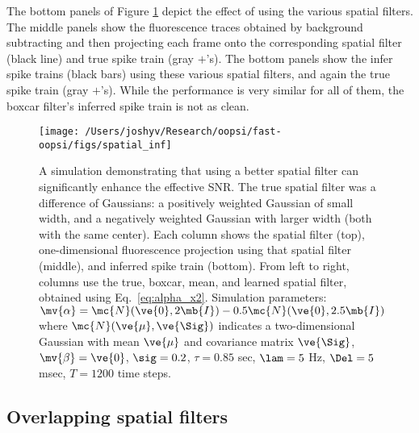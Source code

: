 The bottom panels of Figure \ref{fig:spatial} depict the effect of using the various spatial filters. The middle panels show the fluorescence traces obtained by background subtracting and then projecting each frame onto the corresponding spatial filter (black line) and true spike train (gray $+$'s).  The bottom panels show the infer spike trains (black bars) using these various spatial filters, and again the true spike train (gray $+$'s).  While the performance is very similar for all of them, the boxcar filter's inferred spike train is not as clean.  




\begin{figure}[h!]
\centering \texttt{[image: /Users/joshyv/Research/oopsi/fast-oopsi/figs/spatial\_inf]}
\caption[spatial filtering can improve effective SNR]{A simulation demonstrating that using a better spatial filter can significantly enhance the effective SNR. The true spatial filter was a difference of Gaussians: a positively weighted Gaussian of small width, and a negatively weighted Gaussian with larger width (both with the same center).  Each column shows the spatial filter (top), one-dimensional fluorescence projection using that spatial filter (middle), and inferred spike train (bottom).  From left to right, columns use the true, boxcar, mean, and learned spatial filter, obtained using Eq.~\eqref{eq:alpha_x2}. Simulation parameters: $\mv{\alpha}=\mc{N}(\ve{0},2 \mb{I})-0.5 \mc{N}(\ve{0},2.5 \mb{I})$ where $\mc{N}(\ve{\mu},\ve{\Sig})$ indicates a two-dimensional Gaussian with mean $\ve{\mu}$ and covariance matrix $\ve{\Sig}$, $\mv{\beta}=\ve{0}$, $\sig=0.2$, $\tau=0.85$ sec, $\lam=5$ Hz, $\Del=5$ msec, $T=1200$ time steps.} \label{fig:spatial} 
\end{figure}



\subsection{Overlapping spatial filters} \label{sec:results:overlapping}


